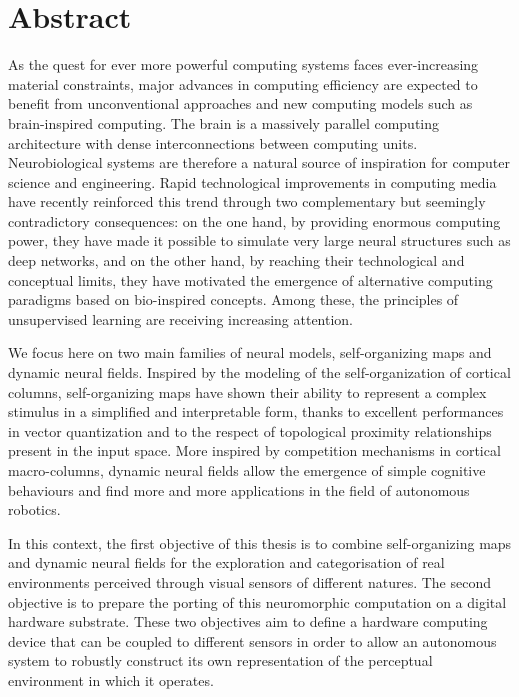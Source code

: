 \chapter*{Abstract}
\markboth{}{}

As the quest for ever more powerful computing systems faces ever-increasing material constraints, major advances in computing efficiency are expected to benefit from unconventional approaches and new computing models such as brain-inspired computing. The brain is a massively parallel computing architecture with dense interconnections between computing units. Neurobiological systems are therefore a natural source of inspiration for computer science and engineering. Rapid technological improvements in computing media have recently reinforced this trend through two complementary but seemingly contradictory consequences: on the one hand, by providing enormous computing power, they have made it possible to simulate very large neural structures such as deep networks, and on the other hand, by reaching their technological and conceptual limits, they have motivated the emergence of alternative computing paradigms based on bio-inspired concepts. Among these, the principles of unsupervised learning are receiving increasing attention.

We focus here on two main families of neural models, self-organizing maps and dynamic neural fields. Inspired by the modeling of the self-organization of cortical columns, self-organizing maps have shown their ability to represent a complex stimulus in a simplified and interpretable form, thanks to excellent performances in vector quantization and to the respect of topological proximity relationships present in the input space. More inspired by competition mechanisms in cortical macro-columns, dynamic neural fields allow the emergence of simple cognitive behaviours and find more and more applications in the field of autonomous robotics.

In this context, the first objective of this thesis is to combine self-organizing maps and dynamic neural fields for the exploration and categorisation of real environments perceived through visual sensors of different natures. The second objective is to prepare the porting of this neuromorphic computation on a digital hardware substrate. These two objectives aim to define a hardware computing device that can be coupled to different sensors in order to allow an autonomous system to robustly construct its own representation of the perceptual environment in which it operates.